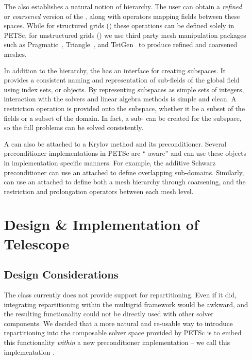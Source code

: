 \documentclass[]{siamart0216}
\begin{document}
The  also establishes a natural notion of hierarchy. The user can obtain a
\textit{refined} or \textit{coarsened} version of the , along with operators
mapping fields between these spaces. While for structured grids () these
operations can be defined solely in PETSc, for unstructured grids () we
use third party mesh manipulation packages such as Pragmatic~\cite{RokosGorman13}, Triangle~\cite{shewchuk96, triangle:homepage},
and TetGen~\cite{tetgen:homepage,Si2015} to produce refined and coarsened
meshes.

In addition to the hierarchy, the  has an interface for creating subspaces. It provides
a consistent naming and representation of sub-fields of the global field using index sets, or
 objects. By representing subspaces as simple sets of integers, interaction with
the solvers and linear algebra methods is simple and clean. A restriction operation is provided
onto the subspace, whether it be a subset of the fields or a subset of the domain. In fact,
a sub- can be created for the subspace, so the full problems can be solved consistently.





A  can also be attached to a Krylov method and its preconditioner. 
Several preconditioner implementations in PETSc are `` aware'' and can use these objects in 
implementation specific manners. For example, the additive Schwarz preconditioner can use an attached  
to define overlapping sub-domains. Similarly,  can use an attached  to define both a mesh 
hierarchy through coarsening, and the restriction and prolongation operators between each mesh level. 

\section{Design \& Implementation of Telescope}

\subsection{Design Considerations}
The  class currently does not provide support for repartitioning.
Even if it did, integrating repartitioning within the multigrid framework would be 
awkward, and the resulting functionality could not be directly used with other solver components. 
We decided that a more natural and re-usable way to introduce repartitioning into the  
composable solver space provided by PETSc is to embed this 
functionality \textit{within} a new preconditioner implementation -- we
call this implementation .
\end{document}
